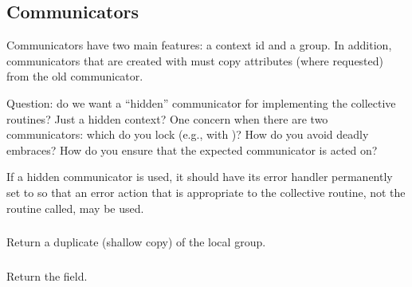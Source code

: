 \documentclass{article}
\begin{document}
\subsubsection{}

\subsection{Communicators}

Communicators have two main features: a context id and a group.  In
addition, communicators that are created with  must
copy attributes (where requested) from the old communicator.

Question: do we want a ``hidden'' communicator for implementing the
collective routines?  Just a hidden context?  One concern when there
are two communicators: which do you lock (e.g., with
)?  How do you avoid deadly embraces?  How do
you 
ensure that the expected communicator is acted on?

If a hidden communicator is used, it should have its error handler permanently
set to  so that an error action that is appropriate to
the collective routine, not the routine called, may be used.

\subsubsection{}
\subsubsection{}
\subsubsection{}
\subsubsection{}
\subsubsection{}
Return a duplicate (shallow copy) of the local group.

\subsubsection{}
Return the  field.
\end{document}

